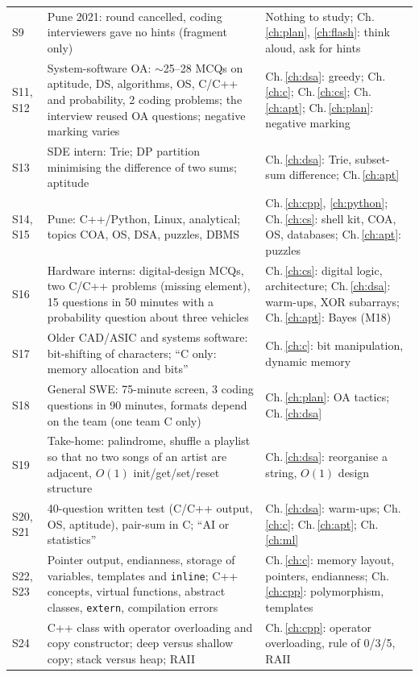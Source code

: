 \documentclass[10pt,a4paper,openany,oneside]{report}
\begin{document}
\begin{center}
\begin{xltabular}{\textwidth}{@{}L{1.2cm}Y L{5.1cm}@{}}
S9 & Pune 2021: round cancelled, coding interviewers gave no hints (fragment only) & Nothing to study; Ch.\,\ref{ch:plan}, \ref{ch:flash}: think aloud, ask for hints\\
S11, S12 & System-software OA: $\sim$25--28 MCQs on aptitude, DS, algorithms, OS, C/C++ and probability, 2 coding problems; the interview reused OA questions; negative marking varies & Ch.\,\ref{ch:dsa}: greedy; Ch.\,\ref{ch:c}; Ch.\,\ref{ch:cs}; Ch.\,\ref{ch:apt}; Ch.\,\ref{ch:plan}: negative marking\\
S13 & SDE intern: Trie; DP partition minimising the difference of two sums; aptitude & Ch.\,\ref{ch:dsa}: Trie, subset-sum difference; Ch.\,\ref{ch:apt}\\
S14, S15 & Pune: C++/Python, Linux, analytical; topics COA, OS, DSA, puzzles, DBMS & Ch.\,\ref{ch:cpp}, \ref{ch:python}; Ch.\,\ref{ch:cs}: shell kit, COA, OS, databases; Ch.\,\ref{ch:apt}: puzzles\\
S16 & Hardware interns: digital-design MCQs, two C/C++ problems (missing element), 15 questions in 50 minutes with a probability question about three vehicles & Ch.\,\ref{ch:cs}: digital logic, architecture; Ch.\,\ref{ch:dsa}: warm-ups, XOR subarrays; Ch.\,\ref{ch:apt}: Bayes (M18)\\
S17 & Older CAD/ASIC and systems software: bit-shifting of characters; ``C only: memory allocation and bits'' & Ch.\,\ref{ch:c}: bit manipulation, dynamic memory\\
S18 & General SWE: 75-minute screen, 3 coding questions in 90 minutes, formats depend on the team (one team C only) & Ch.\,\ref{ch:plan}: OA tactics; Ch.\,\ref{ch:dsa}\\
S19 & Take-home: palindrome, shuffle a playlist so that no two songs of an artist are adjacent, $O(1)$ init/get/set/reset structure & Ch.\,\ref{ch:dsa}: reorganise a string, $O(1)$ design\\
S20, S21 & 40-question written test (C/C++ output, OS, aptitude), pair-sum in C; ``AI or statistics'' & Ch.\,\ref{ch:dsa}: warm-ups; Ch.\,\ref{ch:c}; Ch.\,\ref{ch:apt}; Ch.\,\ref{ch:ml}\\
S22, S23 & Pointer output, endianness, storage of variables, templates and \texttt{inline}; C++ concepts, virtual functions, abstract classes, \texttt{extern}, compilation errors & Ch.\,\ref{ch:c}: memory layout, pointers, endianness; Ch.\,\ref{ch:cpp}: polymorphism, templates\\
S24 & C++ class with operator overloading and copy constructor; deep versus shallow copy; stack versus heap; RAII & Ch.\,\ref{ch:cpp}: operator overloading, rule of 0/3/5, RAII\\

\end{xltabular}
\end{center}
\end{document}
